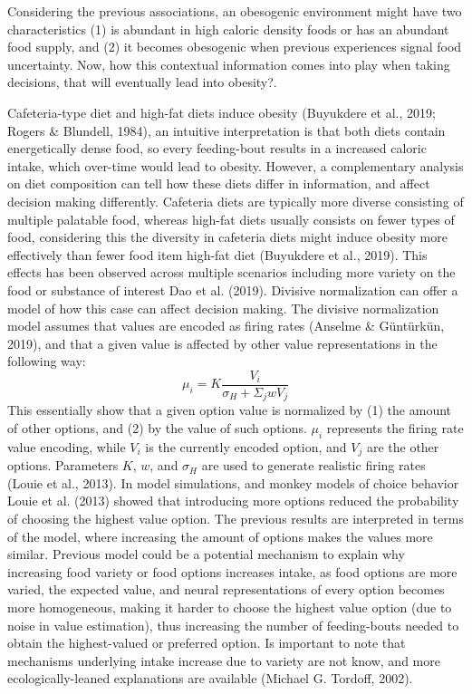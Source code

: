 \documentclass[
]{/home/nicoluarte/Downloads/templates/PNAS-template-main.tex}
\begin{document}
Considering the previous associations, an obesogenic environment might
have two characteristics (1) is abundant in high caloric density foods
or has an abundant food supply, and (2) it becomes obesogenic when
previous experiences signal food uncertainty. Now, how this contextual
information comes into play when taking decisions, that will eventually
lead into obesity?.

Cafeteria-type diet and high-fat diets induce obesity (Buyukdere et al.,
2019; Rogers \& Blundell, 1984), an intuitive interpretation is that
both diets contain energetically dense food, so every feeding-bout
results in a increased caloric intake, which over-time would lead to
obesity. However, a complementary analysis on diet composition can tell
how these diets differ in information, and affect decision making
differently. Cafeteria diets are typically more diverse consisting of
multiple palatable food, whereas high-fat diets usually consists on
fewer types of food, considering this the diversity in cafeteria diets
might induce obesity more effectively than fewer food item high-fat diet
(Buyukdere et al., 2019). This effects has been observed across multiple
scenarios including more variety on the food or substance of interest
Dao et al. (2019). Divisive normalization can offer a model of how this
case can affect decision making. The divisive normalization model
assumes that values are encoded as firing rates (Anselme \& Güntürkün,
2019), and that a given value is affected by other value representations
in the following way:
\[ \mu_i = K \frac{V_i}{\sigma_H + \Sigma_j w V_j}\] This essentially
show that a given option value is normalized by (1) the amount of other
options, and (2) by the value of such options. \(\mu_i\) represents the
firing rate value encoding, while \(V_i\) is the currently encoded
option, and \(V_j\) are the other options. Parameters \(K\), \(w\), and
\(\sigma_H\) are used to generate realistic firing rates (Louie et al.,
2013). In model simulations, and monkey models of choice behavior Louie
et al. (2013) showed that introducing more options reduced the
probability of choosing the highest value option. The previous results
are interpreted in terms of the model, where increasing the amount of
options makes the values more similar. Previous model could be a
potential mechanism to explain why increasing food variety or food
options increases intake, as food options are more varied, the expected
value, and neural representations of every option becomes more
homogeneous, making it harder to choose the highest value option (due to
noise in value estimation), thus increasing the number of feeding-bouts
needed to obtain the highest-valued or preferred option. Is important to
note that mechanisms underlying intake increase due to variety are not
know, and more ecologically-leaned explanations are available (Michael
G. Tordoff, 2002).
\end{document}
